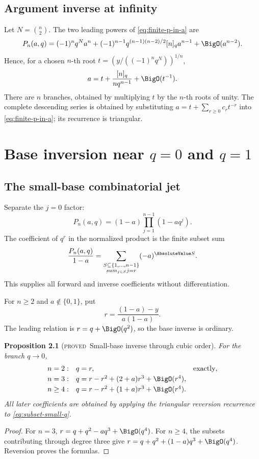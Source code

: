\documentclass[11pt,letterpaper,oneside,openany]{book}
\newtheorem{proposition}{Proposition}[chapter]
\theoremstyle{definition}
\theoremstyle{remark}
\newcommand{\statusproved}{\textcolor{provedgreen}{\textsc{proved}}}
\begin{document}
\section{Argument inverse at infinity}
Let \(N=\binom n2\).  The two leading powers of \cref{eq:finite-p-in-a} are
\[
 P_n(a,q)=(-1)^nq^Na^n
 +(-1)^{n-1}q^{(n-1)(n-2)/2}[n]_q a^{n-1}+\BigO(a^{n-2}).
\]
Hence, for a chosen \(n\)-th root
\(t=(y/((-1)^nq^N))^{1/n}\),
\begin{equation}
 a=t+\frac{[n]_q}{nq^{n-1}}+\BigO(t^{-1}).
 \label{eq:a-inverse-infinity}
\end{equation}
There are \(n\) branches, obtained by multiplying \(t\) by the \(n\)-th roots
of unity.  The complete descending series is obtained by substituting
\(a=t+\sum_{r\ge0}c_rt^{-r}\) into \cref{eq:finite-p-in-a}; its recurrence is
triangular.

\chapter{Base inversion near \(q=0\) and \(q=1\)}

\section{The small-base combinatorial jet}
Separate the \(j=0\) factor:
\[
 P_n(a,q)=(1-a)\prod_{j=1}^{n-1}(1-aq^j).
\]
The coefficient of \(q^r\) in the normalized product is the finite subset sum
\begin{equation}
 [q^r]\frac{P_n(a,q)}{1-a}
 =\sum_{\substack{S\subseteq\{1,\ldots,n-1\}\\sum_{j\in S}j=r}}
 (-a)^{\AbsoluteValue S}.
 \label{eq:subset-small-q}
\end{equation}
This supplies all forward and inverse coefficients without differentiation.

For \(n\ge2\) and \(a\notin\{0,1\}\), put
\[
 r=\frac{(1-a)-y}{a(1-a)}.
\]
The leading relation is \(r=q+\BigO(q^2)\), so the base inverse is ordinary.

\begin{proposition}[\statusproved\ Small-base inverse through cubic order]
For the branch \(q\to0\),
\[
\begin{array}{rll}
 n=2:&q=r,&\text{exactly},\\[0.25em]
 n=3:&q=r-r^2+(2+a)r^3+\BigO(r^4),&\\[0.25em]
 n\ge4:&q=r-r^2+(1+a)r^3+\BigO(r^4).&
\end{array}
\]
All later coefficients are obtained by applying the triangular reversion
recurrence to \cref{eq:subset-small-q}.
\end{proposition}
\begin{proof}
For \(n=3\),
\(r=q+q^2-aq^3+\BigO(q^4)\).  For \(n\ge4\), the subsets contributing through
degree three give
\(r=q+q^2+(1-a)q^3+\BigO(q^4)\).  Reversion proves the formulas.
\end{proof}
\end{document}
